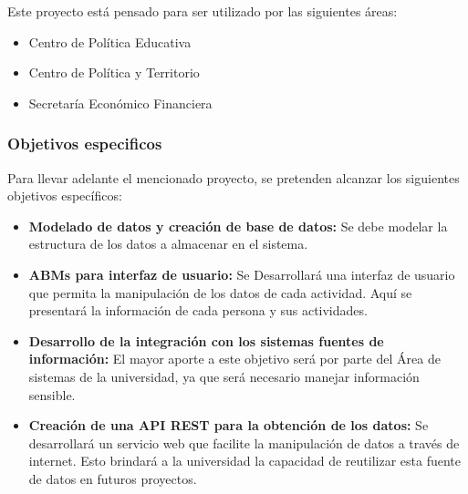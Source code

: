 Este proyecto está pensado para ser utilizado por las siguientes áreas:
\begin{itemize}
    \item Centro de Política Educativa
    \item Centro de Política y Territorio
    \item Secretaría Económico Financiera
\end{itemize}


\subsubsection{Objetivos especificos}%
\label{ssub:objetivos_especificos}

Para llevar adelante el mencionado proyecto, se pretenden alcanzar los siguientes objetivos específicos:

\begin{itemize}
    \item \textbf{Modelado de datos y creación de base de datos:} Se debe modelar la estructura de los datos a almacenar en el sistema.
    \item \textbf{ABMs para interfaz de usuario:} Se Desarrollará una interfaz de usuario que permita la manipulación de los
        datos de cada actividad\@. Aquí se presentará la información de cada persona y sus actividades.
    \item \textbf{Desarrollo de la integración con los sistemas fuentes de información:} El mayor aporte a este objetivo será
        por parte del Área de sistemas de la universidad, ya que será necesario manejar información sensible.
    \item \textbf{Creación de una API REST para la obtención de los datos:} Se desarrollará un servicio web que facilite la
        manipulación de datos a través de internet. Esto brindará a la universidad la capacidad de reutilizar esta fuente de datos en futuros proyectos.
\end{itemize}
